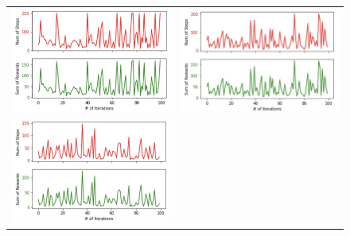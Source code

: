 \documentclass[leqno]{article}
\begin{document}
\begin{multicols}{2}
\begin{figure}[H]
  \begin{tabular}{ll}
    \includegraphics[scale=0.18]{figs/hyp_lr4_exp2.jpeg}&
    \includegraphics[scale=0.18]{figs/hyp_lr4_exp3.jpeg}\\
    \includegraphics[scale=0.18]{figs/hyp_lr5_exp2.jpeg}&

\end{tabular}
\end{figure}
\end{multicols}
\end{document}
